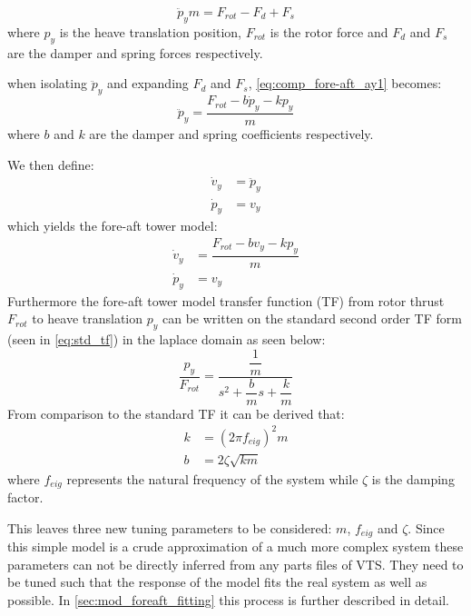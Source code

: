\begin{equation}\label{eq:comp_fore-aft_ay1}
	\ddot{p}_y m = F_{rot} - F_d + F_s
\end{equation}
where $ p_y $ is the heave translation position, $ F_{rot} $ is the rotor force and $ F_d $ and $ F_s $ are the damper and spring forces respectively.

when isolating $ \ddot{p}_y $ and expanding $ F_d $ and $ F_s $, \cref{eq:comp_fore-aft_ay1} becomes:
\begin{equation}\label{eq:comp_fore-aft_ay2}
	\ddot{p}_y = \dfrac{F_{rot} - b \dot{p}_y - k p_y}{m}
\end{equation}
where $ b $ and $ k $ are the damper and spring coefficients respectively.

We then define:
\begin{align}
	\dot{v}_y & = \ddot{p}_y \label{eq:comp_fore-aft_ay} \\
	\dot{p}_y & = v_y \label{eq:comp_fore-aft_vy}
\end{align}
which yields the fore-aft tower model:
\begin{align}
	\dot{v}_y & = \dfrac{F_{rot} - b v_y - k p_y}{m}  \label{eq:comp_fore-aft_1} \\
	\dot{p}_y & = v_y \label{eq:comp_fore-aft_2}
\end{align}
Furthermore the fore-aft tower model transfer function (TF) from rotor thrust $ F_{rot} $ to heave translation $ p_y $ can be written on the standard second order TF form (seen in \cref{eq:std_tf}) in the laplace domain as seen below:
\begin{equation}\label{eq:comp_fore_aft_tf}
	\dfrac{p_y}{F_{rot}} = \dfrac{\dfrac{1}{m}}{s^2 + \dfrac{b}{m} s + \dfrac{k}{m}}
\end{equation}
From comparison to the standard TF it can be derived that:
\begin{align}
	k & = (2 \pi f_{eig})^2 m \label{eq:comp_fore_aft_tf_k} \\
	b & = 2 \zeta \sqrt{k m} \label{eq:comp_fore_aft_tf_b}
\end{align}
where $ f_{eig} $ represents the natural frequency of the system while $ \zeta $ is the damping factor. 

This leaves three new tuning parameters to be considered: $ m $, $ f_{eig} $ and $ \zeta $. Since this simple model is a crude approximation of a much more complex system these parameters can not be directly inferred from any parts files of VTS. They need to be tuned such that the response of the model fits the real system as well as possible. In \cref{sec:mod_foreaft_fitting} this process is further described in detail.

